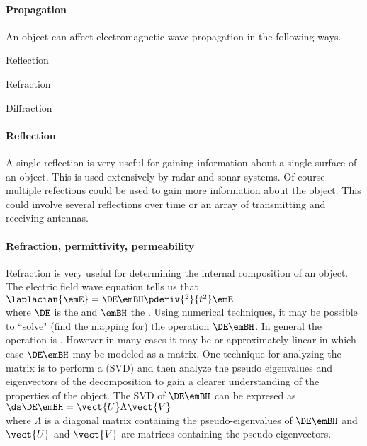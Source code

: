 \paragraph{Propagation}
An object can affect electromagnetic wave propagation in the following ways.
\begin{liste}
   \item Reflection
   \item Refraction
   \item Diffraction
\end{liste}

\paragraph{Reflection}
A single reflection is very useful for gaining information about a single surface of an object.
This is used extensively by radar and sonar systems.
Of course multiple refections could be used to gain more information about the object.
This could involve several reflections over time or an array of transmitting and receiving antennas.

\paragraph{Refraction, permittivity, permeability}
Refraction is very useful for determining the internal composition of an object.
The electric field wave equation tells us that
\\\indentx$\laplacian{\emE} = \DE \emBH \pderiv{^2}{t^2}\emE$\\
where $\DE$ is the  and $\emBH$ the .
Using numerical techniques, it may be possible to ``solve" (find the mapping for)
the operation $\DE \emBH$.
In general the operation is .
However in many cases it may be  or approximately linear in which case
$\DE \emBH$ may be modeled as a matrix.
One technique for analyzing the matrix is to perform a  (SVD)
and then analyze the pseudo eigenvalues and eigenvectors of the decomposition to
gain a clearer understanding of the properties of the object.  The SVD of $\DE\emBH$ can
be expresed as
\\\indentx$\ds\DE\emBH = \vect{U} \Lambda \vect{V}$\\
where $\Lambda$ is a diagonal matrix containing the pseudo-eigenvalues of $\DE\emBH$
and $\vect{U}$ and $\vect{V}$ are matrices containing
the pseudo-eigenvectors.

